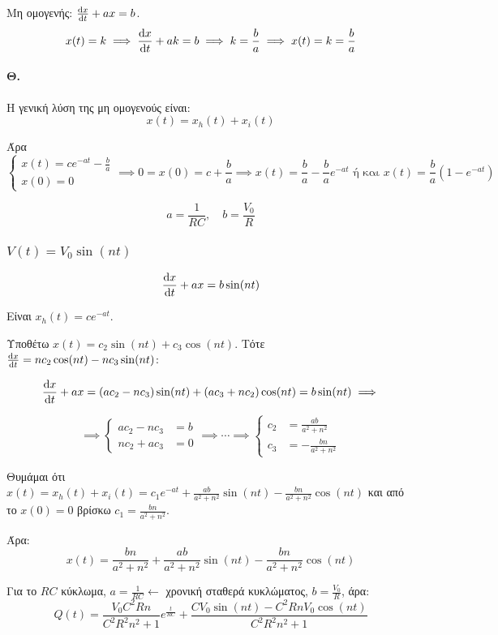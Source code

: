 \documentclass[11pt,a4paper,titlepage,draft]{article}
\begin{document}
Μη ομογενής: \(\frac{\dif x}{\dif t}+ax=b\).
\[
x(t)=k \implies \frac{\dif x}{\dif t}+ak=b \implies k =\frac{b}{a} \implies x(t)=k=\frac{b}{a}
\]

\paragraph{Θ.}
Η γενική λύση της μη ομογενούς είναι:
\[x(t) = x_h(t)+x_i(t) \]

Άρα \[
\begin{cases}
x(t) = ce^{-at} - \frac{b}{a} \\
x(0) = 0
\end{cases}
\implies 0=x(0)=c+\frac{b}{a}
\implies x(t) =\frac{b}{a}-\frac{b}{a}e^{-at} \text{ ή και }
 x(t) =\frac{b}{a}(1-e^{-at})
 \]

 
\[
a=\frac{1}{RC}, \quad b= \frac{V_0}{R}
\]

\subsubsection{\(V(t)=V_0 \sin(nt)\)}
\[
\frac{\dif x}{\dif t} + ax = b\sin (nt)
\]

Είναι \(x_h(t) = ce^{-at}\).

Υποθέτω \(x(t) = c_2 \sin (nt) + c_3 \cos (nt) \). Τότε \( \frac{\dif x}{\dif t} = nc_2 \cos (nt) - nc_3 \sin (nt) \):

\[ \frac{\dif x}{\dif t} +ax =
\left( ac_2 - nc_3
\right)
\sin (nt) +
\left( ac_3 + nc_2
\right) \cos (nt)
= b \sin (nt) \implies
\]

\[
\implies
\begin{cases}
ac_2-nc_3&=b \\
nc_2+ac_3&=0 
\end{cases}
\implies \cdots \implies
\begin{cases}
c_2 &= \frac{ab}{a^2+n^2} \\
c_3 &= -\frac{bn}{a^2+n^2} 
\end{cases}
\]

Θυμάμαι ότι \(x(t) = x_h(t)+x_i(t) = c_1e^{-at} + \frac{ab}{a^2+n^2} \sin (nt) -  \frac{bn}{a^2+n^2} \cos (nt)\) και από το \(x(0)=0\) βρίσκω \(c_1 = \frac{bn}{a^2+n^2}\).

Άρα:
\[
x(t) = \frac{bn}{a^2+n^2} + \frac{ab}{a^2+n^2} \sin (nt) -  \frac{bn}{a^2+n^2} \cos (nt)
\]

Για το \(RC\) κύκλωμα, \(a=\frac{1}{RC} \leftarrow \) χρονική σταθερά κυκλώματος, \(b=\frac{V_0}{R}\), άρα:
\[
Q(t) = \frac{V_0C^2Rn}{C^2R^2n^2+1}e^{\frac{t}{RC}} + \frac{CV_0\sin (nt) - C^2RnV_0 \cos (nt)}{C^2R^2n^2+1}
\]
\end{document}

